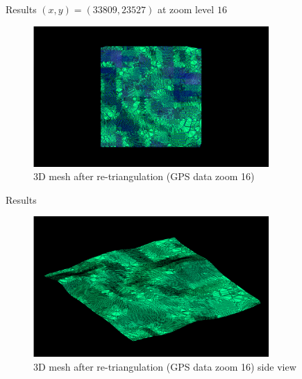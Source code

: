 \documentclass[10pt]{beamer}
\begin{document}
\begin{frame}{Results}
  \centering
  \Large
  $(x, y) = (33809, 23527)$ at zoom level $16$
  \begin{figure}[H]
    \centering
    \includegraphics[width=0.8\textwidth]{images/constrained-grenoble-16-1.png}
    \caption{3D mesh after re-triangulation (GPS data zoom 16)}
\end{figure}
\end{frame}

\begin{frame}{Results}
  \begin{figure}[H]
    \centering
    \includegraphics[width=0.8\textwidth]{images/constrained-grenoble-16-2.png}
    \caption{3D mesh after re-triangulation (GPS data zoom 16) side view}
\end{figure}
\end{frame}
\end{document}
